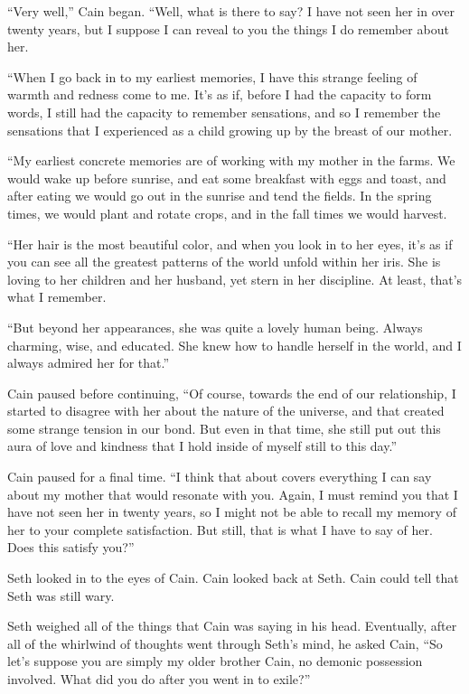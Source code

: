 \documentclass[12pt,twoside,titlepage]{report}
\begin{document}
``Very well,'' Cain began. ``Well, what is there to say? I have not seen
her in over twenty years, but I suppose I can reveal to you the things I
do remember about her.

``When I go back in to my earliest memories, I have this strange feeling
of warmth and redness come to me. It's as if, before I had the capacity
to form words, I still had the capacity to remember sensations, and so I
remember the sensations that I experienced as a child growing up by the
breast of our mother.

``My earliest concrete memories are of working with my mother in the
farms. We would wake up before sunrise, and eat some breakfast with eggs
and toast, and after eating we would go out in the sunrise and tend the
fields. In the spring times, we would plant and rotate crops, and in the
fall times we would harvest.

``Her hair is the most beautiful color, and when you look in to her
eyes, it's as if you can see all the greatest patterns of the world
unfold within her iris. She is loving to her children and her husband,
yet stern in her discipline. At least, that's what I remember.

``But beyond her appearances, she was quite a lovely human being. Always
charming, wise, and educated. She knew how to handle herself in the
world, and I always admired her for that.''

Cain paused before continuing, ``Of course, towards the end of our
relationship, I started to disagree with her about the nature of the
universe, and that created some strange tension in our bond. But even in
that time, she still put out this aura of love and kindness that I hold
inside of myself still to this day.''

Cain paused for a final time. ``I think that about covers everything I
can say about my mother that would resonate with you. Again, I must
remind you that I have not seen her in twenty years, so I might not be
able to recall my memory of her to your complete satisfaction. But
still, that is what I have to say of her. Does this satisfy you?''

Seth looked in to the eyes of Cain. Cain looked back at Seth. Cain could
tell that Seth was still wary.

Seth weighed all of the things that Cain was saying in his head.
Eventually, after all of the whirlwind of thoughts went through Seth's
mind, he asked Cain, ``So let's suppose you are simply my older brother
Cain, no demonic possession involved. What did you do after you went in
to exile?''
\end{document}
